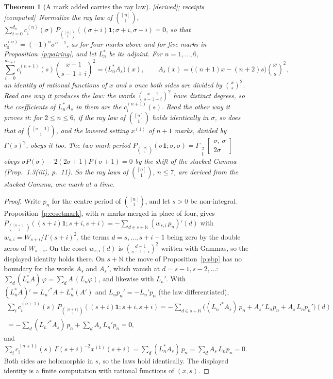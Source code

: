 \documentclass[11pt]{article}
\newcommand{\one}{\mathbf 1}
\newcommand{\Gst}[4]{\Gamma_{\substack{#1\\#2}}\!\begin{bmatrix}#3\\#4\end{bmatrix}}
\theoremstyle{plain}
\newtheorem{theorem}[proposition]{Theorem}
\theoremstyle{definition}
\theoremstyle{remark}
\newcommand{\derived}{\textup{[derived]}}
\newcommand{\computed}{\textup{[computed]}}
\begin{document}
\begin{theorem}[A mark added carries the ray law]\label{t:cert}\derived; receipts \computed\
Normalize the ray law of $\binom{[n]}1$, $\sum_{i=0}^{d_n}c^{(n)}_i(\sigma)\,P_{\binom{[n]}1}((\sigma+i)\one;\sigma+i,\sigma+i)=0$, so that $c_0^{(n)}=(-1)^n\sigma^{n-1}$, as for four marks above and for five marks in Proposition~\ref{p:pairing}, and let $L_n^\ast$ be its adjoint. For $n=1,\dots,6$,
\[
\sum_{i=0}^{d_{n+1}}c^{(n+1)}_i(s)\binom{x-1}{s-1+i}^{\!2}=\big(L_n^\ast A_s\big)(x),\qquad A_s(x)=\big((n+1)x-(n+2)s\big)\binom xs^{\!2},
\]
an identity of rational functions of $x$ and $s$ once both sides are divided by $\binom xs^2$. Read one way it produces the law: the words $\binom{x-1}{s-1+i}^2$ have distinct degrees, so the coefficients of $L_n^\ast A_s$ in them are the $c^{(n+1)}_i(s)$. Read the other way it proves it: for $2\le n\le6$, if the ray law of $\binom{[n]}1$ holds identically in $\sigma$, so does that of $\binom{[n+1]}1$, and the lowered setting $x^{(1)}$ of $n+1$ marks, divided by $\Gamma(s)^2$, obeys it too. The two-mark period $P_{\binom{[2]}1}(\sigma\one;\sigma,\sigma)=\Gst21{\sigma,\ \sigma}{2\sigma}$ obeys $\sigma P(\sigma)-2(2\sigma+1)P(\sigma+1)=0$ by the shift of the stacked Gamma (Prop.~1.3(iii), p.~11). So the ray laws of $\binom{[n]}1$, $n\le7$, are derived from the stacked Gamma, one mark at a time.
\end{theorem}

\begin{proof}
Write $p_n$ for the centre period of $\binom{[n]}1$, and let $s>0$ be non-integral. Proposition~\ref{p:cosetmark}, with $n$ marks merged in place of four, gives $P_{\binom{[n+1]}1}((s+i)\one;s+i,s+i)=-\sum_{d\in s+\mathbb N}(w_{s,i}\,p_n)'(d)$ with $w_{s,i}=W_{s+i}/\Gamma(s+i)^2$, the terms $d=s,\dots,s+i-1$ being zero by the double zeros of $W_{s+i}$. On the coset $w_{s,i}(d)$ is $\binom{d-1}{s-1+i}^2$ written with Gammas, so the displayed identity holds there. On $s+\mathbb N$ the move of Proposition~\ref{p:sbp} has no boundary for the words $A_s$ and $A_s'$, which vanish at $d=s-1,s-2,\dots$: $\sum_d(L_n^\ast A)\,\varphi=\sum_dA\,(L_n\varphi)$, and likewise with $L_n'$. With $(L_n^\ast A)'=L_n'^\ast A+L_n^\ast(A')$ and $L_np_n'=-L_n'p_n$ (the law differentiated),
\begin{multline*}
\sum_ic^{(n+1)}_i(s)\,P_{\binom{[n+1]}1}((s+i)\one;s+i,s+i)=-\sum_{d\in s+\mathbb N}\Big((L_n'^\ast A_s)\,p_n+A_s'\,L_np_n+A_s\,L_np_n'\Big)(d)\\
=-\sum_{d}(L_n'^\ast A_s)\,p_n+\sum_dA_s\,L_n'p_n=0,
\end{multline*}
and $\sum_ic^{(n+1)}_i(s)\,\Gamma(s+i)^{-2}x^{(1)}(s+i)=\sum_d(L_n^\ast A_s)\,p_n=\sum_dA_s\,L_np_n=0$. Both sides are holomorphic in $s$, so the laws hold identically. The displayed identity is a finite computation with rational functions of $(x,s)$.
\end{proof}
\end{document}
